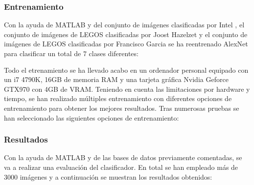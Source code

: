 \subsubsection*{Entrenamiento}
Con la ayuda de MATLAB y del conjunto de imágenes clasificadas por Intel \citep{IntelDataset}, el conjunto de imágenes de LEGOS clasificadas por Joost Hazelzet \citep{LEGODataset} y el conjunto de imágenes de LEGOS clasificadas por Francisco Garcia \citep{LEGODataset2} se ha reentrenado AlexNet para clasificar un total de 7 clases diferentes:


Todo el etrenamiento se ha llevado acabo en un ordenador personal equipado con un i7 4790K, 16GB de memoria RAM y una tarjeta gráfica Nvidia Geforce GTX970 con 4GB de VRAM. Teniendo en cuenta las limitaciones por hardware y tiempo, se han realizado múltiples entrenamiento con diferentes opciones de entrenamiento para obtener los mejores resultados. Tras numerosas pruebas se han seleccionado las siguientes opciones de entrenamiento:


\subsubsection*{Resultados}
Con la ayuda de MATLAB y de las bases de datos previamente comentadas, se va a realizar una evaluación del clasificador. En total se han empleado más de 3000 imágenes y a continuación se muestran los resultados obtenidos:

